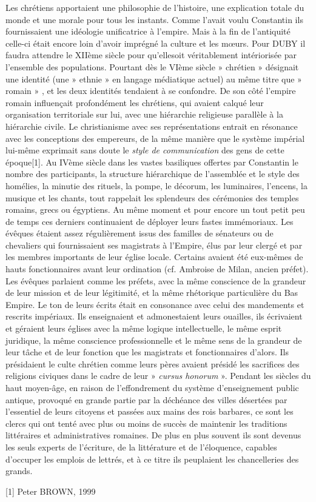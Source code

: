  Les chrétiens apportaient une philosophie de l'histoire, une explication totale du monde et une morale pour tous les instants. Comme l'avait voulu Constantin ils fournissaient une idéologie unificatrice à l'empire. Mais à la fin de l'antiquité celle-ci était encore loin d'avoir imprégné la culture et les mœurs. Pour DUBY il faudra attendre le XIIème siècle pour qu'elle\emph{}soit véritablement intériorisée par l'ensemble des populations. Pourtant dès le VIème siècle » chrétien » désignait une identité (une » ethnie » en langage médiatique actuel) au même titre que » romain » , et les deux identités tendaient à se confondre. 
 De son côté l'empire romain influençait profondément les chrétiens, qui avaient calqué leur organisation territoriale sur lui, avec une hiérarchie religieuse parallèle à la hiérarchie civile. Le christianisme avec ses représentations entrait en résonance avec les conceptions des empereurs, de la même manière que le système impérial lui-même exprimait sans doute le \emph{style de communication} des gens de cette époque[1]. Au IVème siècle dans les vastes basiliques offertes par Constantin le nombre des participants, la structure hiérarchique de l'assemblée et le style des homélies, la minutie des rituels, la pompe, le décorum, les luminaires, l'encens, la musique et les chants, tout rappelait les splendeurs des cérémonies des temples romains, grecs ou égyptiens. Au même moment et pour encore un tout petit peu de temps ces derniers continuaient de déployer leurs fastes immémoriaux. 
 Les évêques étaient assez régulièrement issus des familles de sénateurs ou de chevaliers qui fournissaient ses magistrats à l'Empire, élus par leur clergé et par les membres importants de leur église locale. Certains avaient été eux-mêmes de hauts fonctionnaires avant leur ordination (cf. Ambroise de Milan, ancien préfet). Les évêques parlaient comme les préfets, avec la même conscience de la grandeur de leur mission et de leur légitimité, et la même rhétorique particulière du Bas Empire. Le ton de leurs écrits était en consonance avec celui des mandements et rescrits impériaux. Ils enseignaient et admonestaient leurs ouailles, ils écrivaient et géraient leurs églises avec la même logique intellectuelle, le même esprit juridique, la même conscience professionnelle et le même sens de la grandeur de leur tâche et de leur fonction que les magistrats et fonctionnaires d'alors. Ils présidaient le culte chrétien comme leurs pères avaient présidé les sacrifices des religions civiques dans le cadre de leur » \emph{cursus honorum} ». 
 Pendant les siècles du haut moyen-âge, en raison de l'effondrement du système d'enseignement public antique, provoqué en grande partie par la déchéance des villes désertées par l'essentiel de leurs citoyens et passées aux mains des rois barbares, ce sont les clercs qui ont tenté avec plus ou moins de succès de maintenir les traditions littéraires et administratives romaines. De plus en plus souvent ils sont devenus les seuls experts de l'écriture, de la littérature et de l'éloquence, capables d'occuper les emplois de lettrés, et à ce titre ils peuplaient les chancelleries des grands. 
 
[1] Peter BROWN, 1999